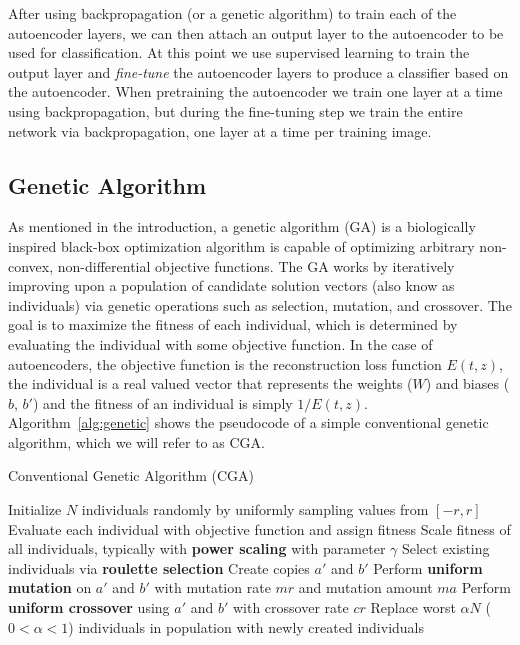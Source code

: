 After using backpropagation (or a genetic algorithm) to train each of the autoencoder layers, we can then attach an output layer to the autoencoder to be used for classification. At this
point we use supervised learning to train the output layer and \textit{fine-tune} the autoencoder layers to produce a classifier based on the autoencoder. When pretraining the autoencoder
we train one layer at a time using backpropagation, but during the fine-tuning step we train the entire network via backpropagation, one layer at a time per training image. 


\subsection{Genetic Algorithm}

As mentioned in the introduction, a genetic algorithm (GA) is a biologically inspired black-box optimization algorithm is capable of optimizing arbitrary non-convex, non-differential objective functions. The GA works by iteratively improving upon a population of candidate solution vectors (also know as individuals) via genetic operations such as selection, mutation, and crossover. The goal is to maximize the fitness of each individual, which is determined by evaluating the individual with some objective function. In the case of autoencoders, the objective function is the reconstruction loss function $E(t,z)$, the individual is a real valued vector that represents the weights ($W$) and biases ($b$, $b'$) and the fitness of an individual is simply $1/E(t,z)$. Algorithm~\ref{alg:genetic} shows the pseudocode of a simple conventional genetic algorithm, which we will refer to as CGA. 

\begin{algorithm}[h]
\caption{Conventional Genetic Algorithm (CGA)}
\label{alg:genetic}
\begin{algorithmic}
\STATE Initialize $N$ individuals randomly by uniformly sampling values from $[-r, r]$
	\STATE Evaluate each individual with objective function and assign fitness
	\STATE Scale fitness of all individuals, typically with \textbf{power scaling} with parameter $\gamma$
	\STATE Select existing individuals via \textbf{roulette selection}
		\STATE Create copies $a'$ and $b'$
		\STATE Perform \textbf{uniform mutation} on $a'$ and $b'$ with mutation rate $mr$ and mutation amount $ma$
		\STATE Perform \textbf{uniform crossover} using $a'$ and $b'$ with crossover rate $cr$
	\ENDFOR
	\STATE Replace worst $\alpha N$ ($0< \alpha < 1$) individuals in population with newly created individuals
\ENDFOR
\end{algorithmic}
\end{algorithm}

